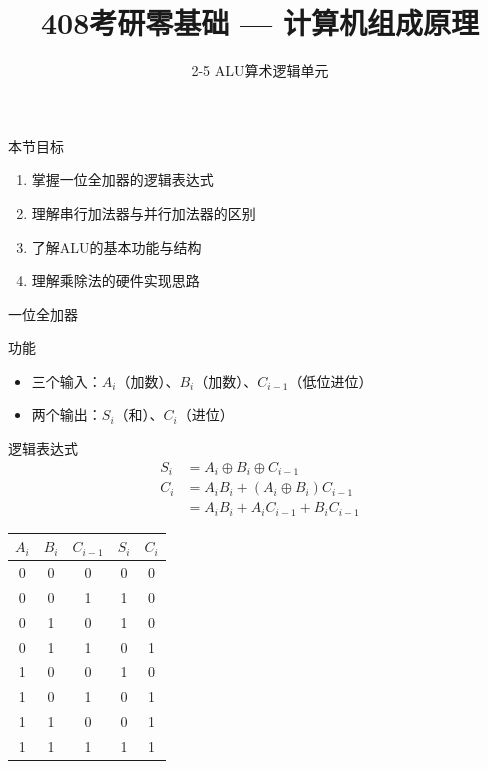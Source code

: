 \documentclass[10pt, aspectratio=169]{beamer}
\title{408考研零基础 --- 计算机组成原理}
\subtitle{2-5 ALU算术逻辑单元}
\author{}
\date{}
\begin{document}
\begin{frame}{本节目标}
    \begin{enumerate}
        \item 掌握一位全加器的逻辑表达式
        \item 理解串行加法器与并行加法器的区别
        \item 了解ALU的基本功能与结构
        \item 理解乘除法的硬件实现思路
    \end{enumerate}
\end{frame}

\begin{frame}{一位全加器}
    \begin{block}{功能}
        \begin{itemize}
            \item 三个输入：$A_i$（加数）、$B_i$（加数）、$C_{i-1}$（低位进位）
            \item 两个输出：$S_i$（和）、$C_i$（进位）
        \end{itemize}
    \end{block}
    \vspace{0.3em}
    \begin{block}{逻辑表达式}
        \begin{align*}
            S_i &= A_i \oplus B_i \oplus C_{i-1} \\
            C_i &= A_i B_i + (A_i \oplus B_i) C_{i-1} \\
                &= A_i B_i + A_i C_{i-1} + B_i C_{i-1}
        \end{align*}
    \end{block}
    \vspace{0.3em}
    \begin{center}
        \begin{tabular}{|ccc|c|c|}
            \hline
            $A_i$ & $B_i$ & $C_{i-1}$ & $S_i$ & $C_i$ \\
            \hline
            0 & 0 & 0 & 0 & 0 \\
            0 & 0 & 1 & 1 & 0 \\
            0 & 1 & 0 & 1 & 0 \\
            0 & 1 & 1 & 0 & 1 \\
            1 & 0 & 0 & 1 & 0 \\
            1 & 0 & 1 & 0 & 1 \\
            1 & 1 & 0 & 0 & 1 \\
            1 & 1 & 1 & 1 & 1 \\
            \hline
        \end{tabular}
    \end{center}
\end{frame}
\end{document}
